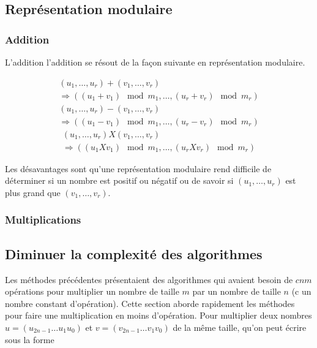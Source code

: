 \documentclass[letterpaper]{article}
\begin{document}
\subsection{Représentation modulaire}

\subsubsection{Addition}

L'addition l'addition se résout de la façon suivante en représentation
modulaire.

\begin{equation}
  \begin{split}
    (u_1, \dots, u_r) + (v_1, \dots, v_r) \\
     \Rightarrow ((u_1 + v_1) \mod m_1, \dots, (u_r + v_r) \mod m_r)
  \end{split}
\end{equation}
\begin{equation}
  \begin{split}
    (u_1, \dots, u_r) - (v_1, \dots, v_r) \\
      \Rightarrow ((u_1 - v_1) \mod m_1, \dots, (u_r - v_r) \mod m_r)
  \end{split}
\end{equation}
\begin{equation}
  \begin{split}
    (u_1, \dots, u_r) X (v_1, \dots, v_r) \\
      \Rightarrow ((u_1 X v_1) \mod m_1, \dots, (u_r X v_r) \mod m_r)
  \end{split}
\end{equation}

Les désavantages sont qu'une représentation modulaire rend difficile de
déterminer si un nombre est positif ou négatif ou de savoir si
$(u_1, \dots, u_r)$ est plus grand que $(v_1, \dots, v_r)$.

\subsubsection{Multiplications}

\subsection{Diminuer la complexité des algorithmes}

Les méthodes précédentes présentaient des algorithmes qui avaient besoin de
$cnm$ opérations pour multiplier un nombre de taille $m$ par un nombre de
taille $n$ (c un nombre constant d'opération). Cette section aborde rapidement
les méthodes pour faire une multiplication en moins d'opération.
\newline
Pour multiplier deux nombres $u = (u_{2n-1} \dots u_1 u_0)$ et
$v = (v_{2n-1} \dots v_1 v_0)$ de la même taille, qu'on peut écrire sous la
forme
\end{document}
